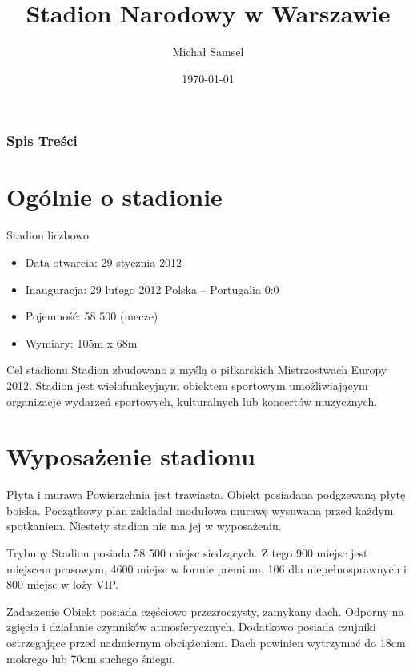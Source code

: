 \documentclass{beamer}
\title{Stadion Narodowy w Warszawie}
\author{Michał Samsel}
\date{\today}
\institute{UWM}
\begin{document}
	\frame{\titlepage}

	\begin{frame}
		\frametitle{Spis Treści}
		\tableofcontents
	\end{frame}

	\section{Ogólnie o stadionie}
	\begin{frame}{Stadion liczbowo}
		\begin{itemize}
		\item Data otwarcia: 29 stycznia 2012
		\item Inauguracja: 29 lutego 2012 Polska – Portugalia 0:0
		\item Pojemność: 58 500 (mecze)
		\item Wymiary: 105m x 68m
		\end{itemize}
	\end{frame}
	
	\begin{frame}{Cel stadionu}
	Stadion zbudowano z myślą o piłkarskich Mistrzostwach Europy 2012. Stadion jest wielofunkcyjnym obiektem sportowym  umożliwiającym organizacje wydarzeń sportowych, kulturalnych lub koncertów muzycznych.
	\end{frame}
	
	\section{Wyposażenie stadionu}
	\begin{frame}{Płyta i murawa}
	Powierzchnia jest trawiasta. Obiekt posiadana podgzewaną płytę boiska. Początkowy plan zakładał modułowa murawę wysuwaną przed każdym spotkaniem. 
	\pause
	Niestety stadion nie ma jej w wyposażeniu.
	\end{frame}
	
	\begin{frame}{Trybuny}
	Stadion posiada 58 500 miejsc siedzących. Z tego 900 miejsc jest miejscem prasowym, 4600 miejsc w formie premium, 106 dla niepełnosprawnych i 800 miejsc w loży VIP.
	\end{frame}
	
	\begin{frame}{Zadaszenie}
	Obiekt posiada częściowo przezroczysty, zamykany dach. Odporny na zgięcia i działanie czynników atmosferycznych.
	\pause
	Dodatkowo posiada czujniki ostrzegające przed nadmiernym obciążeniem. Dach powinien wytrzymać do 18cm mokrego lub 70cm suchego śniegu.
	\end{frame}
	
\end{document}
